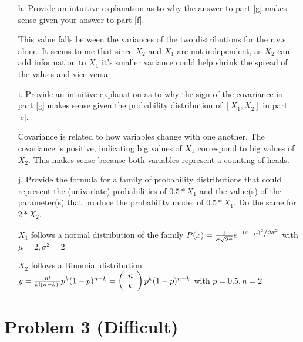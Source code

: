 \documentclass[letterpaper, 11pt]{article}
\begin{document}
\begin{itemize}
\item[h.] Provide an intuitive explanation as to why the answer to part [g] makes sense given your answer to part [f].

This value falls between the variances of the two distributions for the r.v.s alone. It seems to me that since $X_2$ and $X_1$ are not independent, as $X_2$ can add information to $X_1$ it’s smaller variance could help shrink the spread of the values and vice versa. 
\item[i.] Provide an intuitive explanation as to why the sign of the covariance in part [g] makes sense given the probability distribution of $[X_1,X_2]$ in part [e]. 

Covariance is related to how variables change with one another. The covariance is positive, indicating big values of $X_1$ correspond to big values of $X_2$. This makes sense because both variables represent a counting of heads. 


\item[j.] Provide the formula for a family of probability distributions that could represent the (univariate) probabilities of $0.5*X_1$ and the value(s) of the parameter(s) that produce the probability model of $0.5*X_1$.  Do the same for $2*X_2$.  

$X_1$ follows a normal distribution of the family
$P(x) = \frac{1}{{\sigma \sqrt {2\pi } }}e^{{{ - \left( {x - \mu } \right)^2 } \mathord{\left/ {\vphantom {{ - \left( {x - \mu } \right)^2 } {2\sigma ^2 }}} \right. \kern-\nulldelimiterspace} {2\sigma ^2 }}}$
with $\mu = 2, \sigma^2 = 2$

$X_2$ follows a Binomial distribution 
$y = \frac{{n!}}{{k!\left( {n - k} \right)!}}p^k (1-p)^{n - k} = \left( {\begin{array}{*{20}c} n \\ k \\ \end{array}} \right)p^k (1-p)^{n - k}$
with $p = 0.5, n = 2$


\end{itemize}

\section*{Problem 3 (Difficult)}
\end{document}
